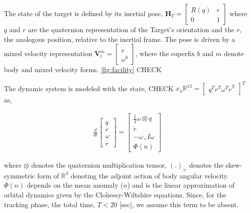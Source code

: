The state of the target is defined by its inertial pose, $\mathbf{H}_T = \begin{bmatrix} R(q) & r \\ 0 & 1\end{bmatrix}$ where $q$ and $r$ are the quaternion representation of the Target's orientation and the $r$, the analogous position, relative to the inertial frame. The pose is driven by a mixed velocity representation $\mathbf{V}_t^m = \begin{bmatrix}\dot{r}\\ \omega^b\end{bmatrix}$, where the superfix $b$ and $m$ denote body and mixed velocity forms. \ref{fig:facility} CHECK

The dynamic system is modeled with the state, CHECK $x_a \mathbb{R}^{13} = \begin{bmatrix}
q^T r^T \omega^T \dot{r}^T
\end{bmatrix}^T$ as,

\begin{align}
\frac{d}{dt}\begin{bmatrix} \dot{q} \\ r \\ \omega \\ \dot{r}\end{bmatrix} = \begin{bmatrix}\frac{1}{2}\omega \otimes q \\ \dot{r} \\-\omega_\times I\omega \\ \Phi(n) \end{bmatrix} \label{eq_SysDyn}
\end{align}

where $\otimes$ denotes the quaternion multiplication tensor, $(.)_\times$ denotes the skew-symmetric form of $\mathbb{R}^3$ denoting the adjoint action of body angular velocity. $\Phi(n)$ depends on the mean anomaly ($n$) and is the linear approximation of orbital dynamics given by the Clohessy-Wiltshire equations. Since, for the tracking phase, the total time, $T < 20$ [sec], we assume this term to be absent.


